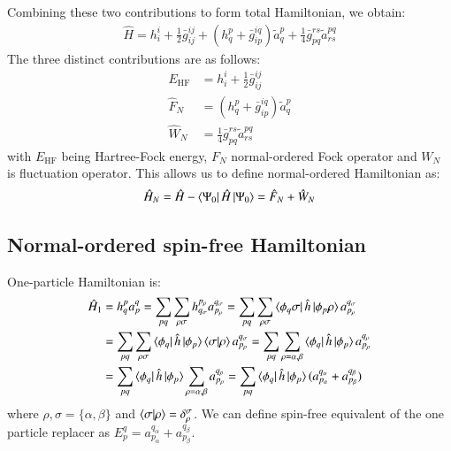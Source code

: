 \documentclass[journal=jacsat]{achemso}
\numberwithin{equation}{section}
\begin{document}
Combining these two contributions to form total Hamiltonian, we obtain:
\begin{align}
\hat{H}=h^{i}_{i}+\frac{1}{2}\bar{g}^{ij}_{ij} + (h^{p}_{q}+\bar{g}^{iq}_{ip})\tilde{a}^{p}_{q}+\frac{1}{4}\bar{g}^{rs}_{pq}\tilde{a}^{pq}_{rs}
\end{align}
The three distinct contributions are as follows:
\begin{align}
E_{\text{HF}}&=h^{i}_{i}+\frac{1}{2}\bar{g}^{ij}_{ij}\\
\hat{F}_{N}&=(h^{p}_{q}+\bar{g}^{iq}_{ip})\tilde{a}^{p}_{q}\\
\hat{W}_{N}&=\frac{1}{4}\bar{g}^{rs}_{pq}\tilde{a}^{pq}_{rs}
\end{align}
with $E_{\text{HF}}$ being Hartree-Fock energy, $F_{N}$ normal-ordered Fock operator and $W_{N}$ is fluctuation operator. This allows us to define normal-ordered Hamiltonian as:
\begin{align}
\hat{H}_{N}= \hat{H}-\bra{\Psi_{0}}\hat{H}\ket{\Psi_{0}}=\hat{F}_{N}+\hat{W}_{N}
\end{align}

\subsection{Normal-ordered spin-free Hamiltonian}
One-particle Hamiltonian is:
\begin{align}
\hat{H}_{1}&=h^{p}_{q}a^{q}_{p}=\sum_{pq}\sum_{\rho\sigma}h^{p_{\rho}}_{q_{\sigma}}a^{q_{\sigma}}_{p_{\rho}}=\sum_{pq}\sum_{\rho\sigma}\bra{\phi_{q}\sigma} \hat{h}\ket{\phi_{p}\rho} a^{q_{\sigma}}_{p_{\rho}}\\
&=\sum_{pq}\sum_{\rho\sigma}\bra{\phi_{q}} \hat{h}\ket{\phi_{p}} \braket{\sigma|\rho}a^{q_{\sigma}}_{p_{\rho}}=\sum_{pq}\sum_{\rho=\alpha,\beta}\bra{\phi_{q}} \hat{h}\ket{\phi_{p}}a^{q_{\rho}}_{p_{\rho}}\\
&=\sum_{pq}\bra{\phi_{q}} \hat{h}\ket{\phi_{p}}\sum_{\rho=\alpha,\beta}a^{q_{\rho}}_{p_{\rho}}=\sum_{pq}\bra{\phi_{q}} \hat{h}\ket{\phi_{p}}(a^{q_{\alpha}}_{p_{\alpha}}+a^{q_{\beta}}_{p_{\beta}})
\end{align}
where $\rho,\sigma=\{\alpha,\beta\}$ and $\braket{\sigma|\rho}=\delta^{\sigma}_{\rho}$. We can define spin-free equivalent of the one particle replacer as $E^{q}_{p}=a^{q_{\alpha}}_{p_{\alpha}}+a^{q_{\beta}}_{p_{\beta}}$.
\end{document}
